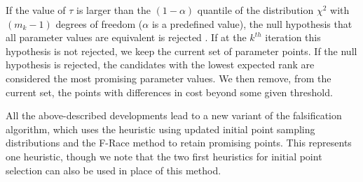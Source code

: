 If the value of $\tau$ is larger than the $(1 - \alpha)$ quantile of the distribution $\chi^2$  with $(m_k - 1)$ degrees of freedom ($\alpha$ is a predefined value), the null hypothesis that all parameter values are equivalent is rejected \cite{AP91}. If at the $k^{th}$ iteration this hypothesis is not rejected, we keep the current set of parameter points. If the null hypothesis is rejected, the candidates with the lowest expected rank are considered the most promising parameter values. We then remove, from the current set, the points with differences in cost beyond some given threshold.  
 
All the above-described developments lead to a new variant of the falsification algorithm, which uses the heuristic using updated initial point sampling distributions and the F-Race method to retain promising points. This represents one heuristic, though we note that the two first heuristics for initial point selection can also be used in place of this method.%

